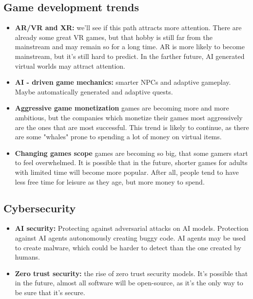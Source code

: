 \documentclass{article}
\begin{document}
\subsection{Game development trends}
\begin{itemize}
    \item \textbf{AR/VR and XR:} we'll see if this path attracts more attention. There are already some great VR games, but that hobby is still far from the mainstream and may remain so for a long time. AR is more likely to become mainstream, but it's still hard to predict. In the farther future, AI generated virtual worlds may attract attention.
    \item \textbf{AI - driven game mechanics:} smarter NPCs and adaptive gameplay. Maybe automatically generated and adaptive quests.
    \item \textbf{Aggressive game monetization} games are becoming more and more ambitious, but the companies which monetize their games most aggressively are the ones that are most successful. This trend is likely to continue, as there are some "whales" prone to spending a lot of money on virtual items.
    \item \textbf{Changing games scope} games are becoming so big, that some gamers start to feel overwhelmed. It is possible that in the future, shorter games for adults with limited time will become more popular. After all, people tend to have less free time for leisure as they age, but more money to spend.
\end{itemize}

\subsection{Cybersecurity}
\begin{itemize}
    \item \textbf{AI security:} Protecting against adversarial attacks on AI models. Protection against AI agents autonomously creating buggy code. AI agents may be used to create malware, which could be harder to detect than the one created by humans.
    \item \textbf{Zero trust security:} the rise of zero trust security models. It's possible that in the future, almost all software will be open-source, as it's the only way to be sure that it's secure.
\end{itemize}
\end{document}
